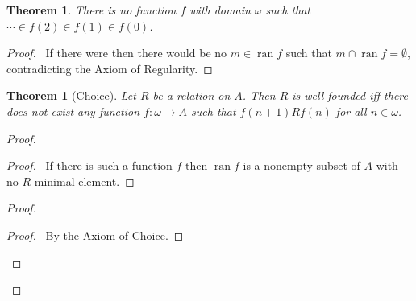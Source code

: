 \documentclass{article}
\let\qed\relax
\newtheorem{theorem}[axiom]{Theorem}
\theoremstyle{definition}
\newcommand{\ran}{\ensuremath{\operatorname{ran}}}
\begin{document}
    \begin{theorem}
        There is no function $f$ with domain $\omega$ such that $\cdots \in f(2) \in f(1) \in f(0)$.
    \end{theorem}

    \begin{proof}
        \pf\ If there were then there would be no $m \in \ran f$ such that $m \cap \ran f = \emptyset$,
        contradicting the Axiom of Regularity. \qed
    \end{proof}

    \begin{theorem}[Choice]
        Let $R$ be a relation on $A$. Then $R$ is well founded iff there does not exist
        any function $f : \omega \rightarrow A$ such that $f(n+1) R f(n)$ for all $n \in \omega$.
    \end{theorem}

    \begin{proof}
        \pf
        \begin{proof}
            \pf\ If there is such a function $f$ then $\ran f$ is a nonempty subset of $A$ with no $R$-minimal
            element.
        \end{proof}
        \begin{proof}
            \begin{proof}
                \pf\ By the Axiom of Choice.
            \end{proof}
        \end{proof}
        \qed
    \end{proof}
\end{document}
